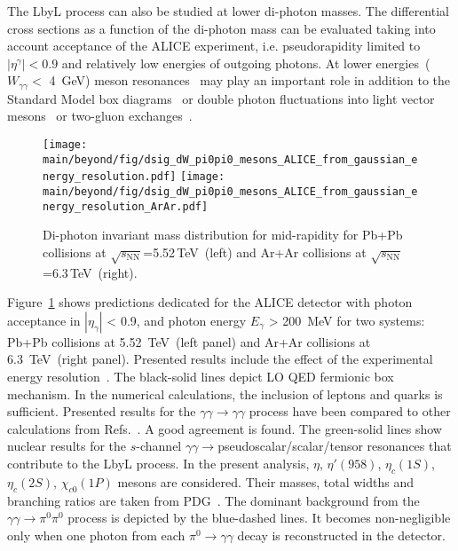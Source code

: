\documentclass[../report.tex]{subfiles}
\providecommand{\main}{..}
\begin{document}
The LbyL process can also be studied at lower di-photon masses. The differential cross sections as a function of the di-photon mass can be evaluated taking into account acceptance of the ALICE experiment, i.e. pseudorapidity limited to $|\eta^\gamma|<0.9$ and relatively low energies of outgoing photons. At lower energies~($W_{\gamma\gamma} <$ 4~GeV) meson resonances~\cite{Klusek-Gawenda:2018ijg} may play an important role in addition to the Standard Model box diagrams~\cite{dEnterria:2013zqi,Klusek-Gawenda:2016euz}
or double photon fluctuations into light vector mesons~\cite{Klusek-Gawenda:2016euz} or two-gluon exchanges~\cite{Klusek-Gawenda:2016nuo}.
\begin{figure}[!h]
        \texttt{[image: \\main/beyond/fig/dsig\_dW\_pi0pi0\_mesons\_ALICE\_from\_gaussian\_energy\_resolution.pdf]}
        \texttt{[image: \\main/beyond/fig/dsig\_dW\_pi0pi0\_mesons\_ALICE\_from\_gaussian\_energy\_resolution\_ArAr.pdf]}
        \caption{
                Di-photon invariant mass distribution for mid-rapidity for Pb+Pb collisions at $\sqrt{s_{\mathrm{NN}}}$=5.52\,TeV~(left) and Ar+Ar collisions at $\sqrt{s_{\mathrm{NN}}}$=6.3\,TeV~(right).
        }
        \label{fig:lbyl_alice}
\end{figure}
Figure~\ref{fig:lbyl_alice} shows predictions dedicated for the ALICE detector with photon acceptance in $|\eta_{\gamma}|$ < 0.9, and photon energy $E_{\gamma}$ > 200~MeV for two systems: Pb+Pb collisions at 5.52~TeV~(left panel) and Ar+Ar collisions at 6.3~TeV~(right panel). Presented results include the effect of the experimental energy resolution~\cite{Acharya:2018yhg}.
The black-solid lines depict LO QED fermionic box mechanism.
In the numerical calculations, the inclusion of leptons and quarks is sufficient. Presented results for the $\gamma\gamma\to\gamma\gamma$ process have been compared to other calculations from Refs.~\cite{Jikia:1993tc,Bern:2001dg,Bardin:2009gq}. A good agreement is found. The green-solid lines show nuclear results for the $s$-channel $\gamma\gamma\to$pseudoscalar/scalar/tensor resonances that contribute to the LbyL process.
In the present analysis, $\eta$, $\eta'(958)$, $\eta_c(1S)$, $\eta_c(2S)$, $\chi_{c0}(1P)$ mesons are considered.
Their masses, total widths and branching ratios are taken from PDG~\cite{Patrignani:2016xqp}.
The dominant background from the $\gamma\gamma\to\pi^0\pi^0$
process is depicted by the blue-dashed lines. It becomes non-negligible  only when one photon from each $\pi^0\to\gamma\gamma$ decay is reconstructed in the detector.
\end{document}
